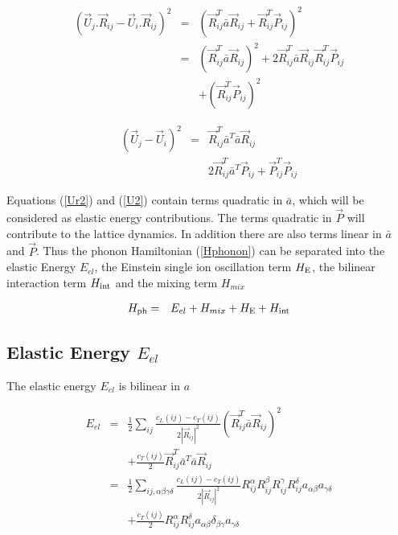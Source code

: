 \begin{eqnarray}\label{Ur2}
(\vec U_j . \vec R_{ij}- \vec U_i . \vec R_{ij})^2 &=&
 (\vec R_{ij}^T\bar a \vec R_{ij}+ \vec R_{ij}^T \vec P_{ij})^2 \nonumber \\
&=& (\vec R_{ij}^T\bar a \vec R_{ij})^2 + 2 \vec R_{ij}^T\bar a \vec R_{ij}\vec R_{ij}^T \vec P_{ij} \nonumber \\
&&+ (\vec R_{ij}^T \vec P_{ij})^2
\end{eqnarray}

\begin{eqnarray}\label{U2}
(\vec U_j - \vec U_i )^2 &=& \vec  R_{ij}^T\bar a^T\bar a \vec R_{ij} \nonumber \\
&&2 \vec  R_{ij}^T\bar a^T\vec P_{ij} + \vec P_{ij}^T \vec P_{ij}
\end{eqnarray}

Equations (\ref{Ur2}) and (\ref{U2}) contain terms quadratic in $\bar a$, which will be
considered as elastic energy contributions. The terms quadratic in $\vec P$ will contribute
to the lattice dynamics. In addition there are also 
terms linear in $\bar a$ and $\vec P$. 
Thus the phonon Hamiltonian (\ref{Hphonon}) can be separated into the elastic Energy $E_{el}$, the
Einstein single ion oscillation term $H_{\rm E}$, the bilinear interaction term $H_{\rm int}$
and the mixing term $H_{mix}$ 

\begin{eqnarray}
H_{\rm ph}& =&E_{el} + H_{mix}+ H_{\rm E}+H_{\rm int}
\end{eqnarray}

\subsection{Elastic Energy $E_{el}$}

The elastic energy $E_{el}$ is bilinear in  $a$

\begin{eqnarray}\label{Eel}
E_{el} &=& \frac{1}{2}\sum_{ij} \frac{c_L(ij)-c_T(ij)}{2|\vec R_{ij}|^2} 
(\vec R_{ij}^T\bar a \vec R_{ij})^2  \\
      && + \frac{c_T(ij)}{2} \vec  R_{ij}^T\bar a^T\bar a \vec R_{ij} \nonumber \\
&=& \frac{1}{2} \sum_{ij,\alpha\beta\gamma\delta} \frac{c_L(ij)-c_T(ij)}{2|\vec R_{ij}|^2} 
R_{ij}^{\alpha}R_{ij}^{\beta}R_{ij}^{\gamma}R_{ij}^{\delta}
a_{\alpha\beta}a_{\gamma\delta} \nonumber \\
&& + \frac{c_T(ij)}{2} R_{ij}^{\alpha} R_{ij}^{\delta}
a_{\alpha\beta} \delta_{\beta\gamma} a_{\gamma\delta}  \nonumber
\end{eqnarray}

